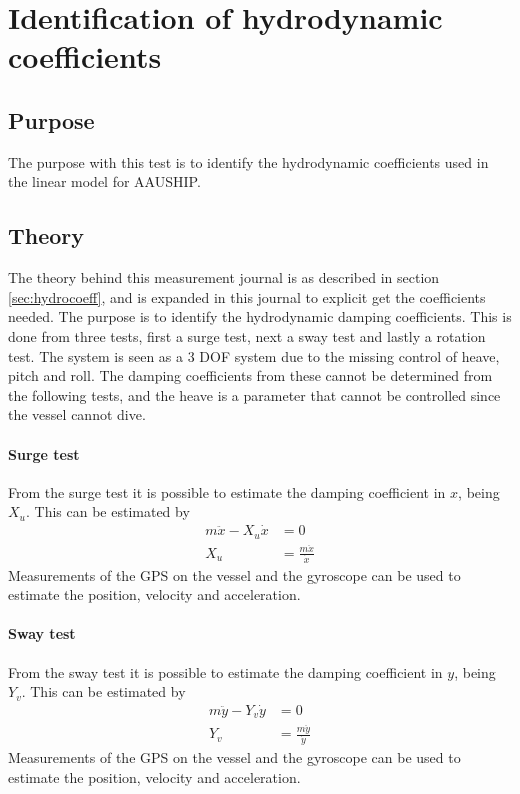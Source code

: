 \chapter{Identification of hydrodynamic coefficients}
\label{app:damping}
\section{Purpose}
The purpose with this test is to identify the hydrodynamic coefficients used in the linear model for AAUSHIP.

\section{Theory}
The theory behind this measurement journal is as described in section
\ref{sec:hydrocoeff}, and is expanded in this journal to explicit get the coefficients needed. The purpose is to identify the hydrodynamic
damping coefficients. This is done from three tests, first a surge
test, next a sway test and lastly a rotation test. The system is seen
as a 3 \ac{DOF} system due to the missing control of heave, pitch and
roll. The damping coefficients from these cannot be determined from
the following tests, and the heave is a parameter that cannot be controlled since the vessel cannot dive.



\subsubsection{Surge test}
From the surge test it is possible to estimate the damping coefficient in $x$, being $X_u$. This can be estimated by
\begin{align}
m \ddot x - X_u \dot x &= 0\\
X_u &= \frac{m \ddot x}{\dot x}
\end{align}
Measurements of the \ac{GPS} on the vessel and the gyroscope can be used to estimate the position, velocity and acceleration.\\

\subsubsection{Sway test}
From the sway test it is possible to estimate the damping coefficient in $y$, being $Y_v$. This can be estimated by
\begin{align}
m \ddot y - Y_v \dot y &= 0\\
Y_v &= \frac{m \ddot y}{\dot y}
\end{align}
Measurements of the \ac{GPS} on the vessel and the gyroscope can be used to estimate
the position, velocity and acceleration.\\

